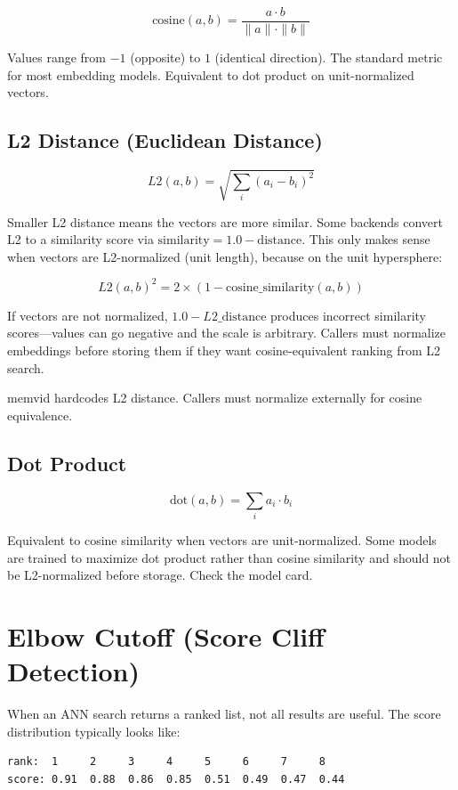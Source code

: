 \[
\text{cosine}(a, b) = \frac{a \cdot b}{\|a\| \cdot \|b\|}
\]

Values range from $-1$ (opposite) to $1$ (identical direction). The standard metric for most
embedding models. Equivalent to dot product on unit-normalized vectors.

\subsection{L2 Distance (Euclidean Distance)}

\[
L2(a, b) = \sqrt{\sum_i (a_i - b_i)^2}
\]

Smaller L2 distance means the vectors are more similar. Some backends convert L2 to a
similarity score via $\text{similarity} = 1.0 - \text{distance}$. This only makes sense when
vectors are L2-normalized (unit length), because on the unit hypersphere:

\[
L2(a, b)^2 = 2 \times (1 - \text{cosine\_similarity}(a, b))
\]

If vectors are not normalized, $1.0 - L2\text{\_distance}$ produces incorrect similarity
scores---values can go negative and the scale is arbitrary. Callers must normalize embeddings
before storing them if they want cosine-equivalent ranking from L2 search.

memvid hardcodes L2 distance. Callers must normalize externally for cosine equivalence.

\subsection{Dot Product}

\[
\text{dot}(a, b) = \sum_i a_i \cdot b_i
\]

Equivalent to cosine similarity when vectors are unit-normalized. Some models are trained to
maximize dot product rather than cosine similarity and should not be L2-normalized before
storage. Check the model card.

\section{Elbow Cutoff (Score Cliff Detection)}

When an ANN search returns a ranked list, not all results are useful. The score distribution
typically looks like:

\begin{Verbatim}
rank:  1     2     3     4     5     6     7     8
score: 0.91  0.88  0.86  0.85  0.51  0.49  0.47  0.44
\end{Verbatim}

